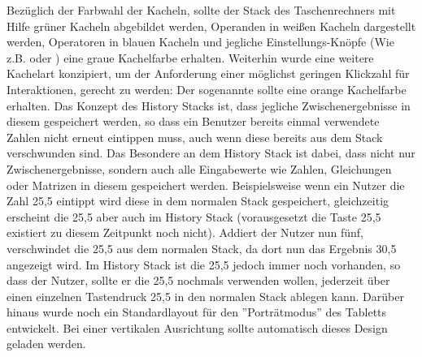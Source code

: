 Bezüglich der Farbwahl der Kacheln, sollte der Stack des Taschenrechners mit Hilfe grüner Kacheln abgebildet werden, Operanden in weißen Kacheln dargestellt werden, Operatoren in blauen Kacheln und jegliche Einstellungs-Knöpfe (Wie z.B.  oder ) eine graue Kachelfarbe erhalten. Weiterhin wurde eine weitere Kachelart konzipiert, um der Anforderung einer möglichst geringen Klickzahl für Interaktionen, gerecht zu werden: Der sogenannte  sollte eine orange Kachelfarbe erhalten. Das Konzept des History Stacks ist, dass jegliche Zwischenergebnisse in diesem gespeichert werden, so dass ein Benutzer bereits einmal verwendete Zahlen nicht erneut eintippen muss, auch wenn diese bereits aus dem Stack verschwunden sind. Das Besondere an dem History Stack ist dabei, dass nicht nur Zwischenergebnisse, sondern auch alle Eingabewerte wie Zahlen, Gleichungen oder Matrizen in diesem gespeichert werden. Beispielsweise wenn ein Nutzer die Zahl 25,5 eintippt wird diese in dem normalen Stack gespeichert, gleichzeitig erscheint die 25,5 aber auch im History Stack (vorausgesetzt die Taste 25,5 existiert zu diesem Zeitpunkt noch nicht). Addiert der Nutzer nun fünf, verschwindet die 25,5 aus dem normalen Stack, da dort nun das Ergebnis 30,5 angezeigt wird. Im History Stack ist die 25,5 jedoch immer noch vorhanden, so dass der Nutzer, sollte er die 25,5 nochmals verwenden wollen, jederzeit über einen einzelnen Tastendruck 25,5 in den normalen Stack ablegen kann. Darüber hinaus wurde noch ein Standardlayout für den ''Porträtmodus'' des Tabletts entwickelt. Bei einer vertikalen Ausrichtung sollte automatisch dieses Design geladen werden. 

